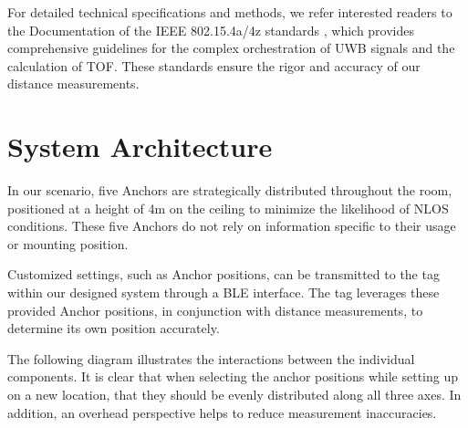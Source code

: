 \documentclass[conference, a4paper]{IEEEtran}
\begin{document}
For detailed technical specifications and methods,
we refer interested readers to the Documentation of
the IEEE 802.15.4a/4z standards \cite{IEEE802154a} \cite{IEEE802154z},
which provides comprehensive guidelines for the
complex orchestration of \ac{UWB} signals and the calculation of \ac{TOF}.
These standards ensure the rigor and accuracy of our distance measurements.

\section{System Architecture}\label{section:system_arch}
In our scenario, five Anchors are strategically distributed throughout the room,
positioned at a height of 4m on the ceiling to minimize the likelihood of 
\ac{NLOS} conditions.
These five Anchors do not rely on information specific to their usage or mounting position.

Customized settings, such as Anchor positions,
can be transmitted to the tag within our designed system through a \ac{BLE} interface.
The tag leverages these provided Anchor positions,
in conjunction with distance measurements,
to determine its own position accurately.

The following diagram illustrates the interactions between the individual components.
It is clear that when selecting the anchor positions while setting up on a new location,
that they should be evenly distributed along all three axes.
In addition, an overhead perspective helps to reduce measurement inaccuracies.
\end{document}

